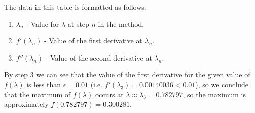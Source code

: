 \documentclass[11pt]{article}
\begin{document}
\begin{sol}
The data in this table is formatted as follows:

\begin{enumerate}
	\item $\lambda_n$ - Value for $\lambda$ at step $n$ in the method.
	\item $f'(\lambda_n)$ - Value of the first derivative at $\lambda_n$.
	\item $f''(\lambda_n)$ - Value of the second derivative at $\lambda_n$. 
\end{enumerate}

By step $3$ we can see that the value of the first derivative for the given value of $f(\lambda)$ is less than $\epsilon = 0.01$ (i.e. $f'(\lambda_3) = 0.00140036 < 0.01$), so we conclude that the maximum of $f(\lambda)$ occurs at $\lambda \approx \lambda_{3} = 0.782797$, so the maximum is approximately $f(0.782797) = 0.300281$.

\end{sol}
\end{document}
